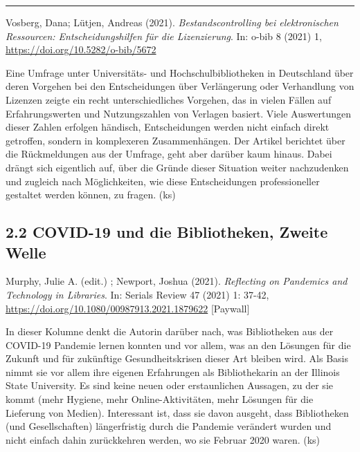 \documentclass[a4paper,
fontsize=11pt,
oneside,
numbers=noperiodatend,
parskip=half-,
bibliography=totoc,
final
]{scrartcl}
\begin{document}
\begin{center}\rule{0.5\linewidth}{0.5pt}\end{center}

Vosberg, Dana; Lütjen, Andreas (2021). \emph{Bestandscontrolling bei
elektronischen Ressourcen: Entscheidungshilfen für die Lizenzierung}.
In: o-bib 8 (2021) 1, \url{https://doi.org/10.5282/o-bib/5672}

Eine Umfrage unter Universitäts- und Hochschulbibliotheken in
Deutschland über deren Vorgehen bei den Entscheidungen über Verlängerung
oder Verhandlung von Lizenzen zeigte ein recht unterschiedliches
Vorgehen, das in vielen Fällen auf Erfahrungswerten und Nutzungszahlen
von Verlagen basiert. Viele Auswertungen dieser Zahlen erfolgen
händisch, Entscheidungen werden nicht einfach direkt getroffen, sondern
in komplexeren Zusammenhängen. Der Artikel berichtet über die
Rückmeldungen aus der Umfrage, geht aber darüber kaum hinaus. Dabei
drängt sich eigentlich auf, über die Gründe dieser Situation weiter
nachzudenken und zugleich nach Möglichkeiten, wie diese Entscheidungen
professioneller gestaltet werden können, zu fragen. (ks)

\pagebreak

\hypertarget{covid-19-und-die-bibliotheken-zweite-welle}{%
\subsection{2.2 COVID-19 und die Bibliotheken, Zweite
Welle}\label{covid-19-und-die-bibliotheken-zweite-welle}}

Murphy, Julie A. (edit.) ; Newport, Joshua (2021). \emph{Reflecting on
Pandemics and Technology in Libraries}. In: Serials Review 47 (2021) 1:
37-42, \url{https://doi.org/10.1080/00987913.2021.1879622} {[}Paywall{]}

In dieser Kolumne denkt die Autorin darüber nach, was Bibliotheken aus
der COVID-19 Pandemie lernen konnten und vor allem, was an den Lösungen
für die Zukunft und für zukünftige Gesundheitskrisen dieser Art bleiben
wird. Als Basis nimmt sie vor allem ihre eigenen Erfahrungen als
Bibliothekarin an der Illinois State University. Es sind keine neuen
oder erstaunlichen Aussagen, zu der sie kommt (mehr Hygiene, mehr
Online-Aktivitäten, mehr Lösungen für die Lieferung von Medien).
Interessant ist, dass sie davon ausgeht, dass Bibliotheken (und
Gesellschaften) längerfristig durch die Pandemie verändert wurden und
nicht einfach dahin zurückkehren werden, wo sie Februar 2020 waren. (ks)
\end{document}
